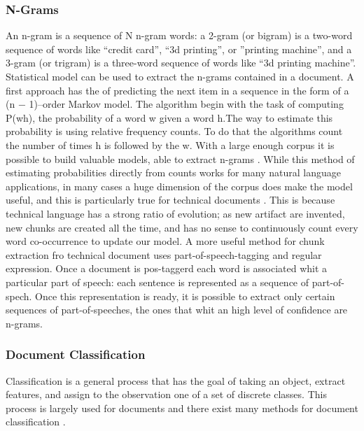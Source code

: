 \documentclass[]{book}
\begin{document}
\subsubsection{N-Grams}\label{sotatoolstransformngrams}

An n-gram is a sequence of N n-gram words: a 2-gram (or bigram) is a
two-word sequence of words like ``credit card'', ``3d printing'', or
''printing machine'', and a 3-gram (or trigram) is a three-word sequence
of words like ``3d printing machine''. Statistical model can be used to
extract the n-grams contained in a document. A first approach has the of
predicting the next item in a sequence in the form of a (n − 1)--order
Markov model\citep{lafferty2001document}. The algorithm begin with the
task of computing P(w\textbar{}h), the probability of a word w given a
word h.The way to estimate this probability is using relative frequency
counts. To do that the algorithms count the number of times h is
followed by the w. With a large enough corpus it is possible to build
valuable models, able to extract n-grams
\citep{bellegarda2004statistical}. While this method of estimating
probabilities directly from counts works for many natural language
applications, in many cases a huge dimension of the corpus does make the
model useful, and this is particularly true for technical documents
\citep{brants2012large}. This is because technical language has a strong
ratio of evolution; as new artifact are invented, new chunks are created
all the time, and has no sense to continuously count every word
co-occurrence to update our model\citep{gibson1994tools}. A more useful
method for chunk extraction fro technical document uses
part-of-speech-tagging and regular expression. Once a document is
pos-taggerd each word is associated whit a particular part of speech:
each sentence is represented as a sequence of part-of-spech. Once this
representation is ready, it is possible to extract only certain
sequences of part-of-speeches, the ones that whit an high level of
confidence are n-grams.

\subsubsection{Document Classification}\label{sotatoolsmodeldocclass}

Classification is a general process that has the goal of taking an
object, extract features, and assign to the observation one of a set of
discrete classes. This process is largely used for documents
\citep{borko1963automatic} and there exist many methods for document
classification \citep{aggarwal2012survey}.
\end{document}
